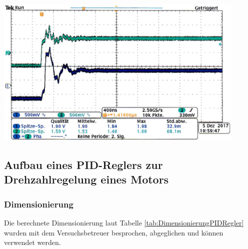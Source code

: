     \begin{center}
        \captionsetup{type=figure}
        \begin{adjustbox}{max width=\linewidth, keepaspectratio}
            \includegraphics[width=120mm]{jpg/Impedanzmessung-mit-Poti}
        \end{adjustbox}
        \label{fig:Impedanzmessung-mit-Poti}
    \end{center}
\endminipage
%
\subsection{Aufbau eines PID-Reglers zur Drehzahlregelung eines Motors}
%
\subsubsection*{Dimensionierung}
%
Die berechnete Dimensionierung laut Tabelle \ref{tab:DimensionierungPIDRegler} wurden mit dem Versuchsbetreuer besprochen, abgeglichen und können verwendet werden.
%
